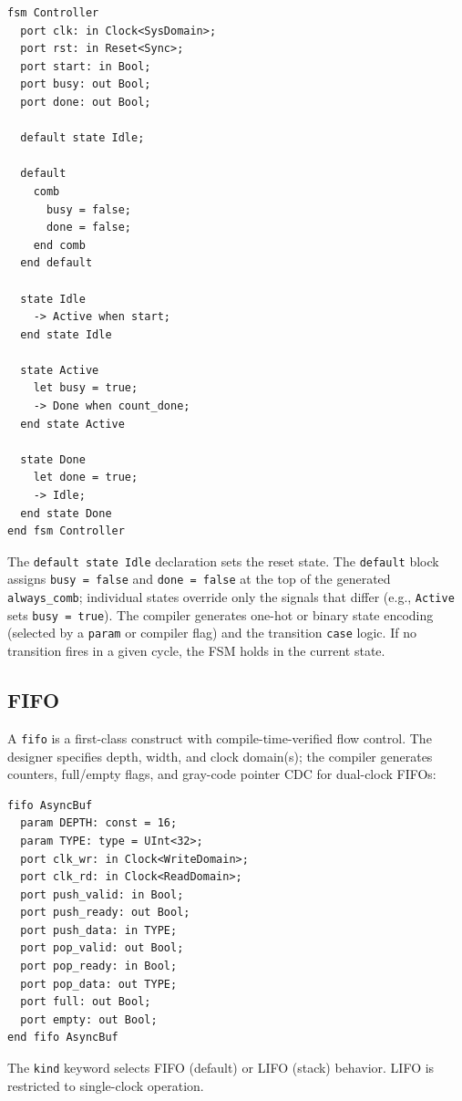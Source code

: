 \documentclass[11pt,twocolumn]{article}
\begin{document}
\begin{lstlisting}[language=Arch,caption={FSM with default block and transitions},label={lst:fsm}]
fsm Controller
  port clk: in Clock<SysDomain>;
  port rst: in Reset<Sync>;
  port start: in Bool;
  port busy: out Bool;
  port done: out Bool;

  default state Idle;

  default
    comb
      busy = false;
      done = false;
    end comb
  end default

  state Idle
    -> Active when start;
  end state Idle

  state Active
    let busy = true;
    -> Done when count_done;
  end state Active

  state Done
    let done = true;
    -> Idle;
  end state Done
end fsm Controller
\end{lstlisting}

The \texttt{default state Idle} declaration sets the reset state. The \texttt{default} block assigns \texttt{busy = false} and \texttt{done = false} at the top of the generated \texttt{always\_comb}; individual states override only the signals that differ (e.g., \texttt{Active} sets \texttt{busy = true}). The compiler generates one-hot or binary state encoding (selected by a \texttt{param} or compiler flag) and the transition \texttt{case} logic. If no transition fires in a given cycle, the FSM holds in the current state.

\subsection{FIFO}

A \texttt{fifo} is a first-class construct with compile-time-verified flow control. The designer specifies depth, width, and clock domain(s); the compiler generates counters, full/empty flags, and gray-code pointer CDC for dual-clock FIFOs:

\begin{lstlisting}[language=Arch,caption={Dual-clock FIFO},label={lst:fifo}]
fifo AsyncBuf
  param DEPTH: const = 16;
  param TYPE: type = UInt<32>;
  port clk_wr: in Clock<WriteDomain>;
  port clk_rd: in Clock<ReadDomain>;
  port push_valid: in Bool;
  port push_ready: out Bool;
  port push_data: in TYPE;
  port pop_valid: out Bool;
  port pop_ready: in Bool;
  port pop_data: out TYPE;
  port full: out Bool;
  port empty: out Bool;
end fifo AsyncBuf
\end{lstlisting}

The \texttt{kind} keyword selects FIFO (default) or LIFO (stack) behavior. LIFO is restricted to single-clock operation.
\end{document}
